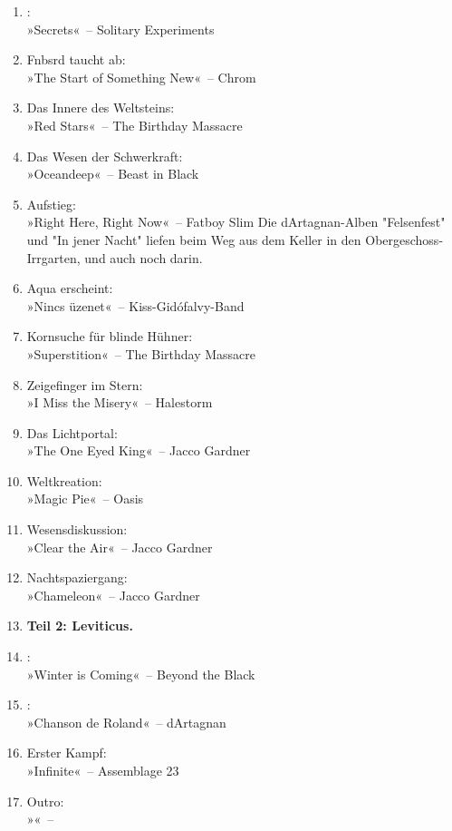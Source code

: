\begin{enumerate}
    \item :\\ »Secrets«~– Solitary Experiments
    \item Fnbsrd taucht ab:\\ »The Start of Something New«~– Chrom
    \item Das Innere des Weltsteins:\\ »Red Stars«~– The Birthday Massacre
    \item Das Wesen der Schwerkraft:\\ »Oceandeep«~– Beast in Black
    \item Aufstieg:\\ »Right Here, Right Now«~– Fatboy Slim
    Die dArtagnan-Alben "Felsenfest" und "In jener Nacht" liefen beim Weg aus dem Keller in den Obergeschoss-Irrgarten, und auch noch darin.

    \item Aqua erscheint:\\ »Nincs üzenet«~– Kiss-Gidófalvy-Band
    \item Kornsuche für blinde Hühner:\\ »Superstition«~– The Birthday Massacre
    \item Zeigefinger im Stern:\\ »I Miss the Misery«~– Halestorm
    \item Das Lichtportal:\\ »The One Eyed King«~– Jacco Gardner
    \item Weltkreation:\\ »Magic Pie«~– Oasis
    \item Wesensdiskussion:\\ »Clear the Air«~– Jacco Gardner
    \item Nachtspaziergang:\\ »Chameleon«~– Jacco Gardner

    \item \textbf{Teil 2: Leviticus.}\\ 
    
    
    \item :\\ »Winter is Coming«~– Beyond the Black


    \item :\\ »Chanson de Roland«~– dArtagnan
    \item Erster Kampf:\\ »Infinite«~– Assemblage 23



    \item Outro:\\ »«~– 
\end{enumerate}

